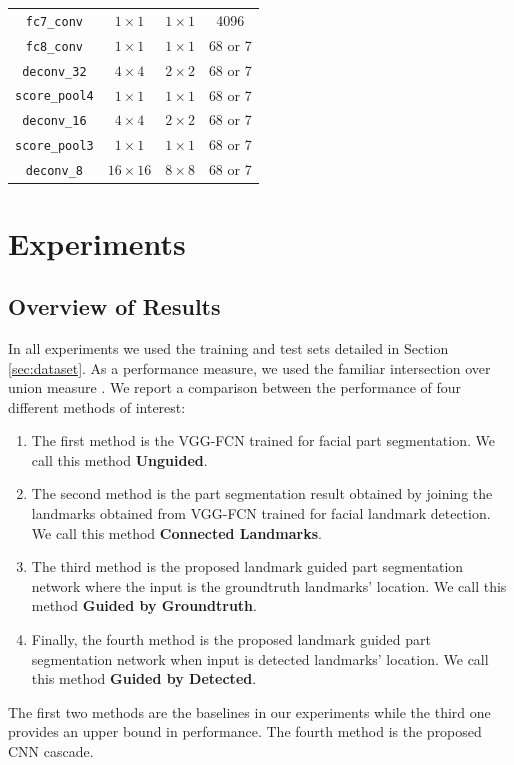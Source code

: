 \begin{table}
\begin{tabular}{|c|c|c|c|}
\texttt{fc7\_conv}   & $1 \times 1$ & $1 \times 1$ & 4096 \\
\texttt{fc8\_conv}   & $1 \times 1$ & $1 \times 1$ & 68 or 7 \\
\texttt{deconv\_32}   & $4 \times 4$ & $2 \times 2$ & 68 or 7 \\
\texttt{score\_pool4} & $1 \times 1$ & $1 \times 1$ & 68 or 7 \\
\texttt{deconv\_16}   & $4 \times 4$ & $2 \times 2$ & 68 or 7 \\
\texttt{score\_pool3} & $1 \times 1$ & $1 \times 1$ & 68 or 7 \\
\texttt{deconv\_8}    & $16 \times 16$ & $8 \times 8$ & 68 or 7 \\
\hline
\end{tabular}
\end{table}


\section{Experiments}

\subsection{Overview of Results}

In all experiments we used the training and test sets detailed in
Section \ref{sec:dataset}. As a performance measure, we used the
familiar intersection over union measure \cite{long2015fully}. We
report a comparison between the performance of four different methods
of interest:
\begin{enumerate}
\item The first method is the VGG-FCN trained for facial part
  segmentation. We call this method \textbf{Unguided}.
\item The second method is the part segmentation result obtained by
  joining the landmarks obtained from VGG-FCN trained for facial
  landmark detection. We call this method \textbf{Connected
    Landmarks}.
\item The third method is the proposed landmark guided part
  segmentation network where the input is the groundtruth landmarks'
  location. We call this method \textbf{Guided by Groundtruth}.
\item Finally, the fourth method is the proposed landmark guided part
  segmentation network when input is detected landmarks' location. We
  call this method \textbf{Guided by Detected}.
\end{enumerate}
The first two methods are the baselines in our experiments while the
third one provides an upper bound in performance. The fourth method is
the proposed CNN cascade.

